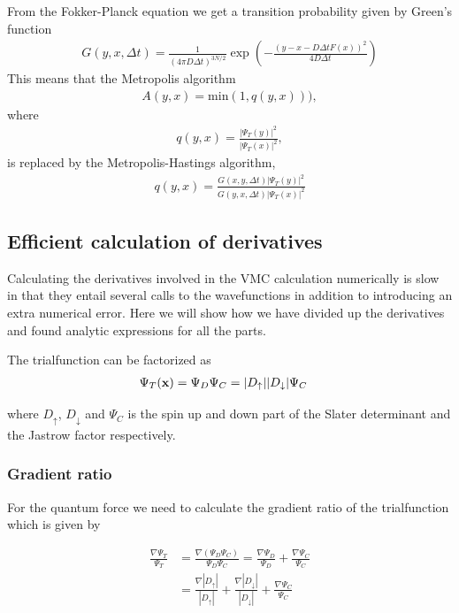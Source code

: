 \documentclass[11pt]{article}
\begin{document}
		From the Fokker-Planck equation we get a transition probability given
		by Green's function
		\begin{align}
			G(y,x,\Delta t)=\frac{1}{(4\pi D\Delta t)^{3N/2}}\exp\left(-\frac{(y-x-D\Delta tF(x))^{2}}{4D\Delta t}\right)
		\end{align}
		This means that the Metropolis algorithm
		\begin{align}
			A(y,x)=\mathrm{min}(1,q(y,x))),
		\end{align}
		where
		\begin{align}
			q(y,x)=\frac{|\Psi_{T}(y)|^{2}}{|\Psi_{T}(x)|^{2}},
		\end{align}
		is replaced by the Metropolis-Hastings algorithm,
		\begin{align}
			q(y,x)=\frac{G(x,y,\Delta t)|\Psi_{T}(y)|^{2}}{G(y,x,\Delta t)|\Psi_{T}(x)|^{2}}
		\end{align}

		\subsection{Efficient calculation of derivatives}
		Calculating the derivatives involved in the VMC calculation numerically is slow in that they entail several calls to the wavefunctions in addition to introducing an extra numerical error. Here we will show how we have divided up the derivatives and found analytic expressions for all the parts.

		The trialfunction can be factorized as
		\begin{align}
			\Psi_T(\vb{x}) &= \Psi_{D} \Psi_C= |D_\uparrow| |D_\downarrow| \Psi_C \label{eq:factorization}
		\end{align}

		where \(D_\uparrow\), \(D_\downarrow\) and \(\Psi_C\) is the spin up and down part of the Slater determinant and the Jastrow factor respectively.

		\subsubsection{Gradient ratio}
			For the quantum force we need to calculate the gradient ratio of the trialfunction which is given by

			\begin{align}
				\frac{\nabla \Psi_T}{ \Psi_T } &= \frac{\nabla( \Psi_D\Psi_C  )}{ \Psi_D\Psi_C } = \frac{ \nabla \Psi_D }{\Psi_D } + \frac{\nabla \Psi_C}{\Psi_C}
				\\
				&= \frac{\nabla |D_\uparrow|}{|D_\uparrow|} + \frac{ \nabla |D_\downarrow|}{|D_\downarrow|} + \frac{\nabla \Psi_C}{\Psi_C}
			\end{align}
\end{document}
